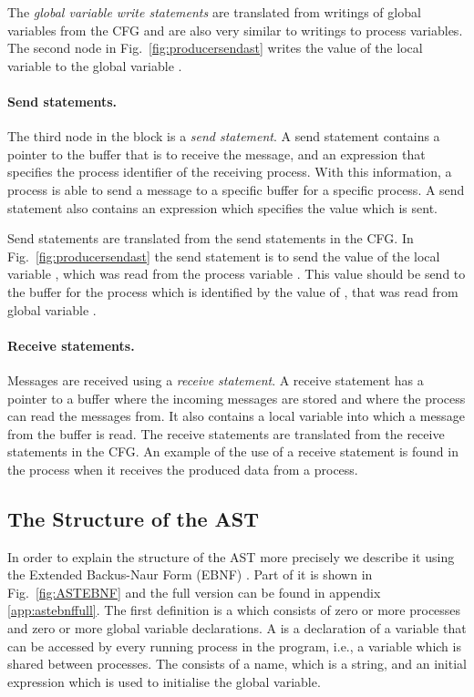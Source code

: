 The \emph{global variable write statements} are translated from writings of global variables from the CFG and are also very similar to writings to process variables. The second node in Fig.~\ref{fig:producersendast} writes the value of the local variable  to the global variable .

\paragraph*{Send statements.} The third node in the  block is a \emph{send statement}. A send statement contains a pointer to the buffer that is to receive the message, and an expression that specifies the process identifier of the receiving process. With this information, a process is able to send a message to a specific buffer for a specific process. A send statement also contains an expression which specifies the value which is sent.

Send statements are translated from the send statements in the CFG. In Fig.~\ref{fig:producersendast} the send statement is to send the value of the local variable , which was read from the process variable . This value should be send to the buffer  for the process which is identified by the value of , that was read from global variable .

\paragraph*{Receive statements.} Messages are received using a \emph{receive statement}. A receive statement has a pointer to a buffer where the incoming messages are stored and where the process can read the messages from. It also contains a local variable into which a message from the buffer is read. The receive statements are translated from the receive statements in the CFG. An example of the use of a receive statement is found in the  process when it receives the produced data from a  process.

\subsection{The Structure of the AST}



In order to explain the structure of the AST more precisely we describe it using the Extended Backus-Naur Form (EBNF) \cite{EBNF}. Part of it is shown in Fig.~\ref{fig:ASTEBNF} and the full version can be found in appendix \ref{app:astebnffull}. The first definition is a  which consists of zero or more processes and zero or more global variable declarations. A  is a declaration of a variable that can be accessed by every running process in the program, i.e., a variable which is shared between processes. The  consists of a name, which is a string, and an initial expression which is used to initialise the global variable.

